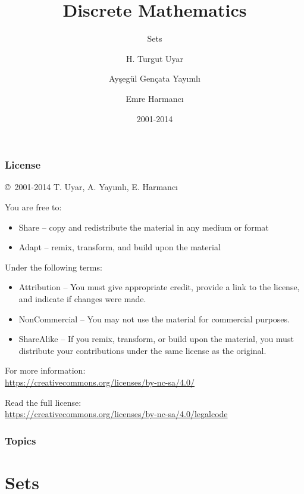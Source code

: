 \documentclass[dvipsnames]{beamer}
\title{Discrete Mathematics}
\subtitle{Sets}
\author{H. Turgut Uyar \and Ayşegül Gençata Yayımlı \and Emre Harmancı}
\date{2001-2014}
\begin{document}
\begin{frame}
  \titlepage
\end{frame}

\begin{frame}
  \frametitle{License}

  \hfill
  \copyright~2001-2014 T. Uyar, A. Yayımlı, E. Harmancı

  \vfill
  \begin{footnotesize}
    You are free to:
    \begin{itemize}
      \itemsep0em
      \item Share -- copy and redistribute the material in any medium or format
      \item Adapt -- remix, transform, and build upon the material
    \end{itemize}

    Under the following terms:
    \begin{itemize}
      \itemsep0em
      \item Attribution -- You must give appropriate credit, provide a link to
        the license, and indicate if changes were made.

      \item NonCommercial -- You may not use the material for commercial
        purposes.

      \item ShareAlike -- If you remix, transform, or build upon the material,
        you must distribute your contributions under the same license as the
        original.
    \end{itemize}
  \end{footnotesize}

  \begin{small}
    For more information:\\
    \url{https://creativecommons.org/licenses/by-nc-sa/4.0/}

    \smallskip
    Read the full license:\\
    \url{https://creativecommons.org/licenses/by-nc-sa/4.0/legalcode}
  \end{small}
\end{frame}

\begin{frame}
  \frametitle{Topics}
  \tableofcontents
\end{frame}

\section{Sets}
\end{document}

